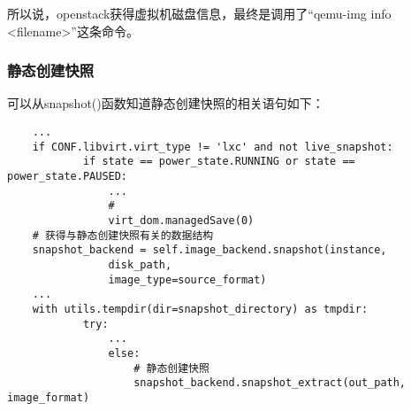 \documentclass[a4paper,left=1.5cm,right=1.5cm,11pt]{article}
\begin{document}
	所以说，openstack获得虚拟机磁盘信息，最终是调用了“qemu-img info <filename>”这条命令。

\subsubsection{静态创建快照}
	可以从snapshot()函数知道静态创建快照的相关语句如下：
	\begin{lstlisting}
	...
	if CONF.libvirt.virt_type != 'lxc' and not live_snapshot:
            if state == power_state.RUNNING or state == power_state.PAUSED:
                ...
				# 
                virt_dom.managedSave(0)
	# 获得与静态创建快照有关的数据结构
	snapshot_backend = self.image_backend.snapshot(instance,
                disk_path,
                image_type=source_format)
	...
	with utils.tempdir(dir=snapshot_directory) as tmpdir:
            try:
				...
                else:
					# 静态创建快照
                    snapshot_backend.snapshot_extract(out_path, image_format)
	\end{lstlisting}

\clearpage
\end{document}
